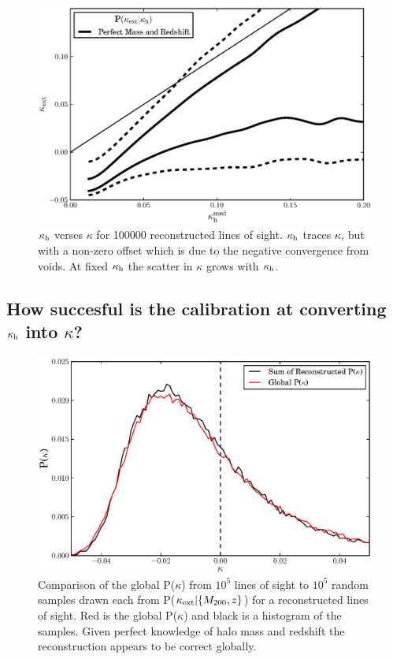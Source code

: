 \documentclass[useAMS,usenatbib]{mn2e}
\begin{document}
\begin{figure}
\includegraphics[width=\columnwidth]{figs/cornerplot.eps}
\caption[Biased?]{$\kappa_{\rm h}$ verses $\kappa$ for 100000 reconstructed lines of sight. $\kappa_{\rm h}$ traces $\kappa$, but with a non-zero offset which is due to the negative convergence from voids. At fixed $\kappa_{\rm h}$ the scatter in $\kappa$ grows with $\kappa_{\rm h}$.}
\label{fig:isitbiased}
\end{figure}


\subsection{How succesful is the calibration at converting $\kappa_{\rm h}$ into $\kappa$?}

\begin{figure}
\includegraphics[width=\columnwidth]{figs/globaldist.eps}
\caption[magcut]{Comparison of the global P($\kappa$) from $10^{5}$ lines of sight to $10^{5}$ random samples drawn each from P($\kappa_{\rm ext}|\{M_{200},z\}$) for a reconstructed lines of sight. Red is the global P($\kappa$) and black is a histogram of the samples. Given perfect knowledge of halo mass and redshift the reconstruction appears to be correct globally.}
\label{fig:globaldist}
\end{figure}
\end{document}
